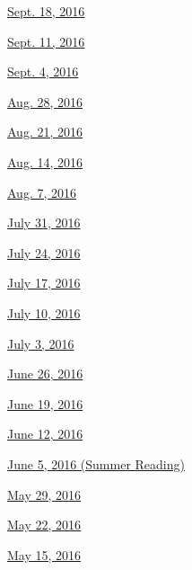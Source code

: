 \href{http://www.nytimes.com/indexes/2016/09/18/todayspaper/index.html\#bookreview}{Sept.
18, 2016}

\href{http://www.nytimes.com/indexes/2016/09/18/todayspaper/index.html\#bookreview}{Sept.
11, 2016}

\href{http://www.nytimes.com/indexes/2016/09/04/todayspaper/index.html\#bookreview}{Sept.
4, 2016}

\href{http://www.nytimes.com/indexes/2016/08/28/todayspaper/index.html\#bookreview}{Aug.
28, 2016}

\href{http://www.nytimes.com/indexes/2016/08/21/todayspaper/index.html\#bookreview}{Aug.
21, 2016}

\href{http://www.nytimes.com/indexes/2016/08/14/todayspaper/index.html\#bookreview}{Aug.
14, 2016}

\href{http://www.nytimes.com/indexes/2016/08/07/todayspaper/index.html\#bookreview}{Aug.
7, 2016}

\href{http://www.nytimes.com/indexes/2016/07/31/todayspaper/index.html\#bookreview}{July
31, 2016}

\href{http://www.nytimes.com/indexes/2016/07/24/todayspaper/index.html\#bookreview}{July
24, 2016}

\href{http://www.nytimes.com/indexes/2016/07/17/todayspaper/index.html\#bookreview}{July
17, 2016}

\href{http://www.nytimes.com/indexes/2016/07/10/todayspaper/index.html\#bookreview}{July
10, 2016}

\href{http://www.nytimes.com/indexes/2016/07/03/todayspaper/index.html\#bookreview}{July
3, 2016}

\href{http://www.nytimes.com/indexes/2016/06/26/todayspaper/index.html\#bookreview}{June
26, 2016}

\href{http://www.nytimes.com/indexes/2016/06/19/todayspaper/index.html\#bookreview}{June
19, 2016}

\href{http://www.nytimes.com/indexes/2016/06/12/todayspaper/index.html\#bookreview}{June
12, 2016}

\href{http://www.nytimes.com/indexes/2016/06/05/todayspaper/index.html\#bookreview}{June
5, 2016 (Summer Reading)}

\href{http://www.nytimes.com/indexes/2016/05/29/todayspaper/index.html\#bookreview}{May
29, 2016}

\href{http://www.nytimes.com/indexes/2016/05/22/todayspaper/index.html\#bookreview}{May
22, 2016}

\href{http://www.nytimes.com/indexes/2016/05/15/todayspaper/index.html\#bookreview}{May
15, 2016}

